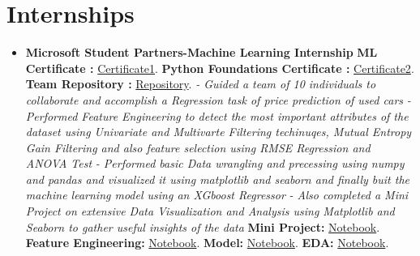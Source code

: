 \documentclass[a4paper,12pt]{article}
\begin{document}
\section*{Internships}
\begin{itemize}
    \item{\textbf{\large{Microsoft Student Partners-Machine Learning Internship}}
    \newline
    \textbf{ ML Certificate :} \href{https://github.com/teetangh/Kaustav-All-Certifications/blob/master/Artificial%20Intelligence/MSP%20ML%20Internship/internship%20certificate.jpg}{Certificate1}.
    \textbf{ Python Foundations Certificate :} \href{https://github.com/teetangh/Kaustav-All-Certifications/blob/master/Artificial%20Intelligence/MSP%20ML%20Internship/Course%20Completion%20Certificate.jpg}{Certificate2}.
    \textbf{ Team Repository :} \href{https://github.com/Microsoft-ML-Internship-Team/Major-Project-Submissions}{Repository}.
    \newline
    \textit{- Guided a team of 10 individuals to collaborate and accomplish a Regression task of price prediction of used cars}
    \newline
    \textit{- Performed Feature Engineering to detect the most important attributes of the dataset using Univariate and Multivarte Filtering techinuqes, Mutual Entropy Gain Filtering and also feature selection using RMSE Regression and ANOVA Test  }
    \newline
    \textit{- Performed basic Data wrangling and precessing using numpy and pandas and visualized it using matplotlib and seaborn and finally buit the machine learning model using an XGboost Regressor }
    \newline
    \textit{- Also completed a Mini Project on extensive Data Visualization and Analysis using Matplotlib and Seaborn to gather useful insights of the data}
    \newline
    \textbf{ Mini Project:} \href{https://github.com/teetangh/Microsoft-Machine-Learning-Internship/blob/master/MINOR%20PROJECT/Microsoft_Minor_Project_v2.ipynb}{Notebook}.
    \newline
    \textbf{ Feature Engineering:} \href{https://github.com/Microsoft-ML-Internship-Team/Major-Project-Submissions/blob/master/KAUSTAV/02_Kaustav_feature_engineering_v4.ipynb}{Notebook}.
    \textbf{ Model:} \href{https://github.com/Microsoft-ML-Internship-Team/Major-Project-Submissions/blob/master/KAUSTAV/03_Kaustav_Buidling_the_model_v1.ipynb}{Notebook}.
    \textbf{ EDA:} \href{https://github.com/Microsoft-ML-Internship-Team/Major-Project-Submissions/blob/master/KAUSTAV/01_Kaustav_data_preprocess_EDA_v7.ipynb}{Notebook}.}
\end{itemize}
\end{document}
